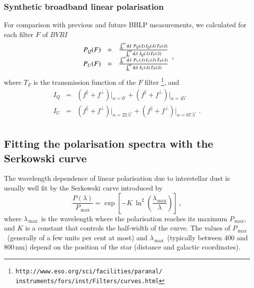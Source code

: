 \documentclass[a4paper]{aa}
\newcommand{\pq}{\ensuremath{P_Q}}
\newcommand{\pu}{\ensuremath{P_U}}
\newcommand{\pl}{\ensuremath{P}}
\newcommand{\fo}{\ensuremath{f^\parallel}}
\newcommand{\fe}{\ensuremath{f^\perp}}
\newcommand{\lmax}{\ensuremath{\lambda_\mathrm{\,max}}}
\newcommand{\pmax}{\ensuremath{P_\mathrm{\,max}}}
\begin{document}
\subsubsection{Synthetic broadband linear polarisation}\label{Sect_Convolution}
For comparison with previous and future BBLP measurements, we
calculated for each filter $F$ of $BVRI$
\begin{equation}
  \begin{array}{rcl}
\pq(F)&=&\frac{\int_{0}^{\infty}\mathrm{d}{\lambda}\
\pq({\lambda})\, I_Q({\lambda})\, T_{\rm F}({\lambda})}{\int_{0}^{\infty}\mathrm{d}{\lambda}\ I_Q({\lambda})\,T_{\rm F}({\lambda})}\\
\pu(F)&=&\frac{\int_{0}^{\infty}\mathrm{d}{\lambda}\
\pu({\lambda})\, I_U(\lambda)\, T_{\rm F}({\lambda})}{\int_{0}^{\infty}\mathrm{d}{\lambda}\ I_U({\lambda})\,T_{\rm F}({\lambda})}\\
\end{array}
  ,\end{equation}
where $T_{F}$ is the transmission function of the $F$ filter
\footnote{\tt http://www.eso.org/sci/facilities/paranal/\\instruments/fors/inst/Filters/curves.html},
and
\begin{equation}
\begin{array}{rcl}
I_Q &=& \left(\fo + \fe\right) \vert_{\alpha = 0^\circ} + 
        \left(\fo + \fe\right) \vert_{\alpha = 45^\circ} \\[2mm]
I_U &=& \left(\fo + \fe\right) \vert_{\alpha = 22.5^\circ} + 
        \left(\fo + \fe\right) \vert_{\alpha = 67.5^\circ} \; .\\
\end{array}
\end{equation}


\subsection{Fitting the polarisation spectra with the Serkowski curve}\label{Sect_Serkowski}
The wavelength dependence of linear polarisation due to interstellar dust is usually well
fit by the Serkowski curve introduced by
\citet{Serkowski73}
\begin{equation}
\frac{\pl(\lambda)}{\pmax} = \exp \left[ -K \ \ln^2
    \left( \frac{\lmax}{\lambda} \right) \right]\,,
\label{Eq_Serkowski}
\end{equation}
where \lmax\ is the wavelength where the polarisation reaches its
maximum \pmax, and $K$ is a constant that controls the half-width of
the curve. The values of \pmax\ (generally of a few units per cent at
most) and \lmax\ (typically between 400 and 800\,nm) depend on the
position of the star (distance and galactic coordinates).
\end{document}
